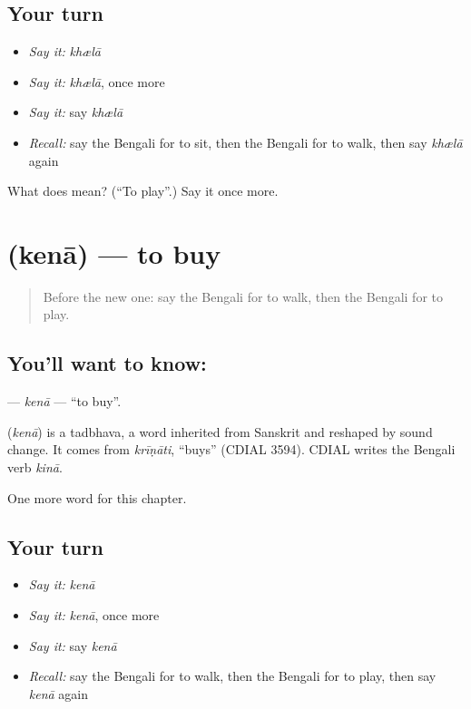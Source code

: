 \subsection*{Your turn}
\begin{itemize}
\raggedright
  \item \emph{Say it:} \emph{khælā}
  \item \emph{Say it:} \emph{khælā}, once more
  \item \emph{Say it:} say \emph{khælā}
  \item \emph{Recall:} say the Bengali for to sit, then the Bengali for to walk, then say \emph{khælā} again
\end{itemize}

\begin{tcolorbox}[breakable,colback=teal!4,colframe=teal!35!black,title={Before you move on}]
What does  mean? (\textquotedblleft{}To play\textquotedblright{}.) Say it once more.
\end{tcolorbox}
\section[\texorpdfstring{\bn{কেনা} (kenā)}{কেনা (kenā)}]{ (kenā) — to buy}

\label{lesson:BN-C49-kena}



\begin{quote}
Before the new one: say the Bengali for to walk, then the Bengali for to play.
\end{quote}

\subsection*{You'll want to know: }
\textbf{} — \emph{kenā} — \textquotedblleft{}to buy\textquotedblright{}.

\begin{cousinweb}
\textbf{} (\emph{kenā}) is a tadbhava, a word inherited from Sanskrit and reshaped by sound change. It comes from \emph{krīṇāti}, \textquotedblleft{}buys\textquotedblright{} (CDIAL 3594). CDIAL writes the Bengali verb \emph{kinā}.
\end{cousinweb}

\begin{grammarlens}[title={What you've built}]
One more word for this chapter.
\end{grammarlens}

\subsection*{Your turn}
\begin{itemize}
\raggedright
  \item \emph{Say it:} \emph{kenā}
  \item \emph{Say it:} \emph{kenā}, once more
  \item \emph{Say it:} say \emph{kenā}
  \item \emph{Recall:} say the Bengali for to walk, then the Bengali for to play, then say \emph{kenā} again
\end{itemize}

